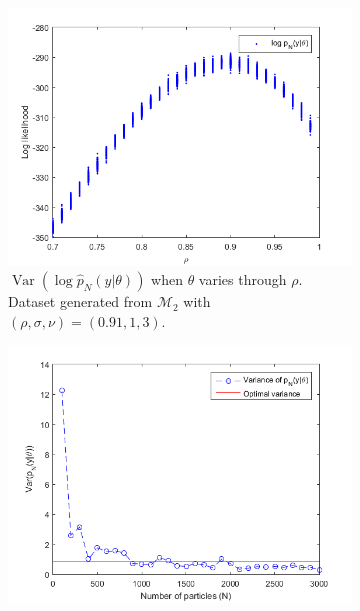 \documentclass[11pt,a4,twosided,singlespacing,titlepagenumber=on]{scrreprt}
\numberwithin{equation}{chapter} %
\theoremstyle{remark}
\DeclareMathOperator{\var}{Var}
\begin{document}
\begin{figure}[H]
    \centering
    \begin{subfigure}[1a]{0.49\textwidth}
        \centering
        \includegraphics[width=1\textwidth]{tuning_n_rho_varying}
        \caption{$\var(\log \hat{p}_N(y|\theta))$ when $\theta$ varies through $\rho$. Dataset generated from $\mathcal{M}_2$ with $(\rho,\sigma,\nu) = (0.91,1,3)$.}
        \label{tuning_n_rho_varying}
    \end{subfigure}
    \begin{subfigure}[1b]{0.49\textwidth}
        \centering
        \includegraphics[width=1\textwidth]{tuning_n_optimal_var}

\end{subfigure}
\end{figure}
\end{document}
